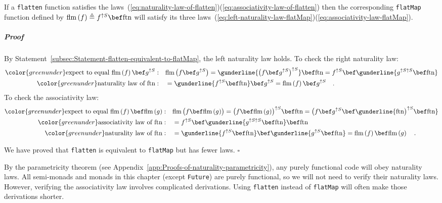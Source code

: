 If a \lstinline!flatten! function satisfies the laws~(\ref{eq:naturality-law-of-flatten})\textendash (\ref{eq:associativity-law-of-flatten})
then the corresponding \lstinline!flatMap! function defined by $\text{flm}\left(f\right)\triangleq f^{\uparrow S}\bef\text{ftn}$
will satisfy its three laws~(\ref{eq:left-naturality-law-flatMap})\textendash (\ref{eq:associativity-law-flatMap}).

\subparagraph{Proof}

By Statement~\ref{subsec:Statement-flatten-equivalent-to-flatMap},
the left naturality law holds. To check the right naturality law:
\begin{align*}
{\color{greenunder}\text{expect to equal }\text{flm}\left(f\right)\bef g^{\uparrow S}:}\quad & \text{flm}\,\big(f\bef g^{\uparrow S}\big)=\gunderline{\big(f\bef g^{\uparrow S}\big)^{\uparrow S}}\bef\text{ftn}=f^{\uparrow S}\bef\gunderline{g^{\uparrow S\uparrow S}\bef\text{ftn}}\\
{\color{greenunder}\text{naturality law of }\text{ftn}:}\quad & =\gunderline{f^{\uparrow S}\bef\text{ftn}}\bef g^{\uparrow S}=\text{flm}\left(f\right)\bef g^{\uparrow S}\quad.
\end{align*}
To check the associativity law:
\begin{align*}
{\color{greenunder}\text{expect to equal }\text{flm}\left(f\right)\bef\text{flm}\left(g\right):}\quad & \text{flm}\,\big(f\bef\text{flm}\,(g)\big)=\big(f\bef\text{flm}\,(g)\big)^{\uparrow S}\bef\text{ftn}=\big(f\bef g^{\uparrow S}\bef\gunderline{\text{ftn}\big)^{\uparrow S}\bef\text{ftn}}\\
{\color{greenunder}\text{associativity law of }\text{ftn}:}\quad & =f^{\uparrow S}\bef\gunderline{g^{\uparrow S\uparrow S}\bef\text{ftn}}\bef\text{ftn}\\
{\color{greenunder}\text{naturality law of }\text{ftn}:}\quad & =\gunderline{f^{\uparrow S}\bef\text{ftn}}\bef\gunderline{g^{\uparrow S}\bef\text{ftn}}=\text{flm}\left(f\right)\bef\text{flm}\left(g\right)\quad.
\end{align*}
 

We have proved that \lstinline!flatten! is equivalent to \lstinline!flatMap!
but has fewer laws. $\square$

By the parametricity theorem (see Appendix~\ref{app:Proofs-of-naturality-parametricity}),
any purely functional code will obey naturality laws. All semi-monads
and monads in this chapter (except \lstinline!Future!) are purely
functional, so we will not need to verify their naturality laws. However,
verifying the associativity law involves complicated derivations.
Using \lstinline!flatten! instead of \lstinline!flatMap! will often
make those derivations shorter.

